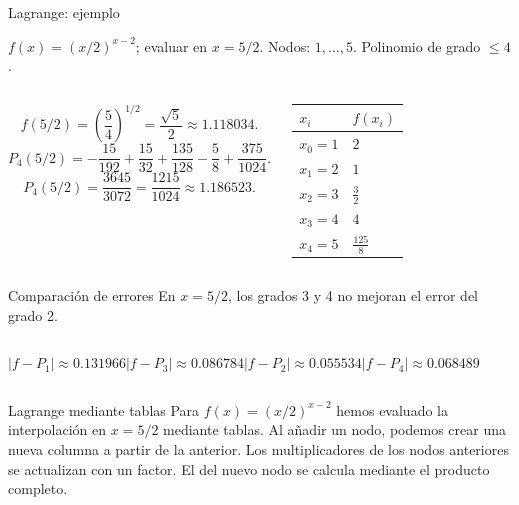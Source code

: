 \documentclass[main.tex]{subfiles}
\begin{document}
\begin{frame}[t]{Lagrange: ejemplo}
\par\noindent\begin{minipage}[t][7.5mm][t]{\textwidth}\small\strut $f(x)=(x/2)^{x-2}$; evaluar en $x=5/2$. Nodos: $1,\ldots,5$. Polinomio de grado $\le 4$.\end{minipage}\par\nointerlineskip
\begin{columns}[T]\small\setlength{\abovedisplayskip}{4pt}\setlength{\belowdisplayskip}{4pt}\[f(5/2)=\left(\frac54\right)^{1/2}=\frac{\sqrt5}{2}\approx1.118034.\]\scriptsize\[P_4(5/2)=-\frac{15}{192}+\frac{15}{32}+\frac{135}{128}-\frac58+\frac{375}{1024}.\]\[P_4(5/2)=\frac{3645}{3072}=\frac{1215}{1024}\approx1.186523.\]\begingroup\small\setlength{\tabcolsep}{3pt}\begin{center}\begin{tabular}{|C{.42\textwidth}|C{.42\textwidth}|}\hline
\rule[-2mm]{0pt}{6mm}$x_i$&$f(x_i)$\\\hline
\rule[-2.5mm]{0pt}{6mm}$x_0=1$&$2$\\\hline
\rule[-2.5mm]{0pt}{6mm}$x_1=2$&$1$\\\hline
\rule[-2.5mm]{0pt}{6mm}$x_2=3$&$\frac{3}{2}$\\\hline
\rule[-2.5mm]{0pt}{6mm}$x_3=4$&$4$\\\hline
\rule[-2.5mm]{0pt}{6mm}$x_4=5$&$\frac{125}{8}$\\\hline
\end{tabular}\end{center}\endgroup\par
\end{columns}
\end{frame}
\begin{frame}[t]{Comparación de errores}
\small En $x=5/2$, los grados 3 y 4 no mejoran el error del grado 2.
\begin{columns}\centering $|f-P_1|\approx0.131966$\centering $|f-P_3|\approx0.086784$\centering $|f-P_2|\approx0.055534$\centering $|f-P_4|\approx0.068489$\end{columns}
\end{frame}
\begin{frame}[t]{Lagrange mediante tablas}
Para $f(x)=(x/2)^{x-2}$ hemos evaluado la interpolación en $x=5/2$ mediante tablas.
\bigskip
Al añadir un nodo, podemos crear una nueva columna a partir de la anterior.
\bigskip
Los multiplicadores de los nodos anteriores se actualizan con un factor. El del nuevo nodo se calcula mediante el producto completo.
\end{frame}
\end{document}
